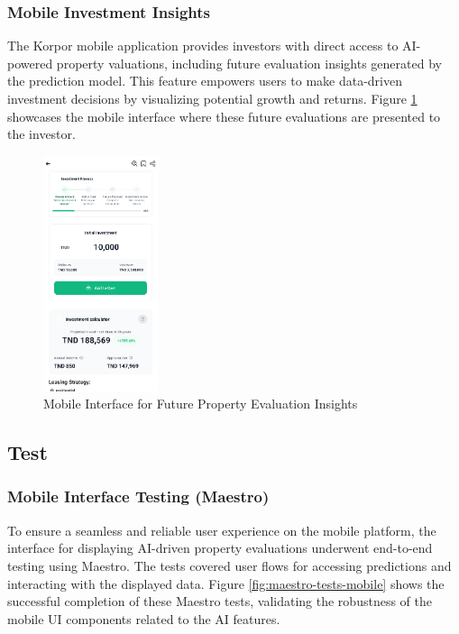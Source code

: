 \subsubsection{Mobile Investment Insights}
The Korpor mobile application provides investors with direct access to AI-powered property valuations, including future evaluation insights generated by the prediction model. This feature empowers users to make data-driven investment decisions by visualizing potential growth and returns. Figure \ref{fig:mobile-future-evaluation} showcases the mobile interface where these future evaluations are presented to the investor.
\newpage
\begin{figure}[htbp]
    \centering
    \includegraphics[width=0.3\textwidth]{images/mobile_future_evaluation.png} %
    \caption{Mobile Interface for Future Property Evaluation Insights}
    \label{fig:mobile-future-evaluation}
\end{figure}


\subsection{Test}
\subsubsection{Mobile Interface Testing (Maestro)}
To ensure a seamless and reliable user experience on the mobile platform, the interface for displaying AI-driven property evaluations underwent end-to-end testing using Maestro. The tests covered user flows for accessing predictions and interacting with the displayed data. Figure \ref{fig:maestro-tests-mobile} shows the successful completion of these Maestro tests, validating the robustness of the mobile UI components related to the AI features.

